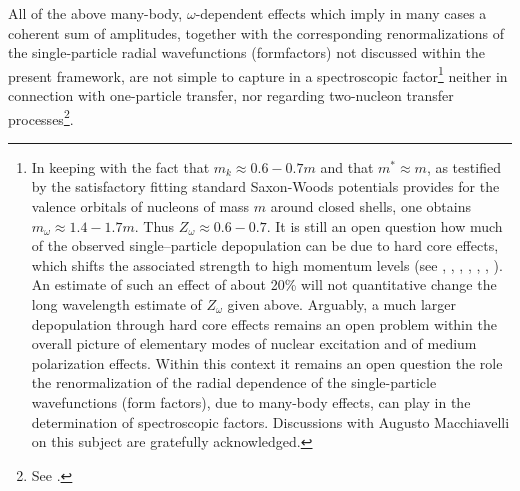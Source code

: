 All of the above many-body, $\omega$-dependent effects which imply in many cases a coherent sum of amplitudes, together with the corresponding renormalizations of the single-particle radial wavefunctions (formfactors) not discussed within the present framework, are not simple to capture in a spectroscopic factor\footnote{In keeping with the fact that $m_k\approx 0.6-0.7 m$ and that $m^*\approx m$, as testified by the satisfactory fitting standard Saxon-Woods potentials provides for the valence orbitals of nucleons of mass $m$ around closed shells, one obtains $m_\omega\approx 1.4-1.7 m$. Thus $Z_\omega \approx 0.6-0.7$. It is still an open question how much of the observed single--particle depopulation can be due to hard core effects, which shifts the associated strength to high momentum levels (see \cite{Dickhoff:05}, \cite{Jenning:11}, \cite{Kramer:01}, \cite{Barbieri:09}, \cite{Schiffer:12}, \cite{Duguet:12}, \cite{Furnstahl:10}).  An estimate of such an effect of about 20\% will not quantitative change the long wavelength estimate of $Z_\omega$ given above. Arguably, a much larger depopulation through hard core effects remains an open problem within the overall picture of elementary modes of nuclear excitation and of medium polarization effects. Within this context it remains an open question  the role   the renormalization of the radial dependence of the single-particle wavefunctions (form factors), due to many-body effects, can play in the determination of spectroscopic factors. Discussions with Augusto Macchiavelli on this subject are gratefully acknowledged.} neither in connection with one-particle transfer, nor regarding two-nucleon transfer processes\footnote{See \cite{Barranco:05,Barranco:99}.}. 






